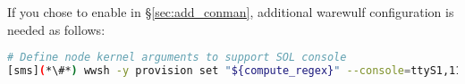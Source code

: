 If you chose to enable \conman{} in \S\ref{sec:add_conman}, additional
warewulf configuration is needed as follows:
\begin{lstlisting}[language=bash,keywords={},upquote=true]
# Define node kernel arguments to support SOL console
[sms](*\#*) wwsh -y provision set "${compute_regex}" --console=ttyS1,115200
\end{lstlisting}

